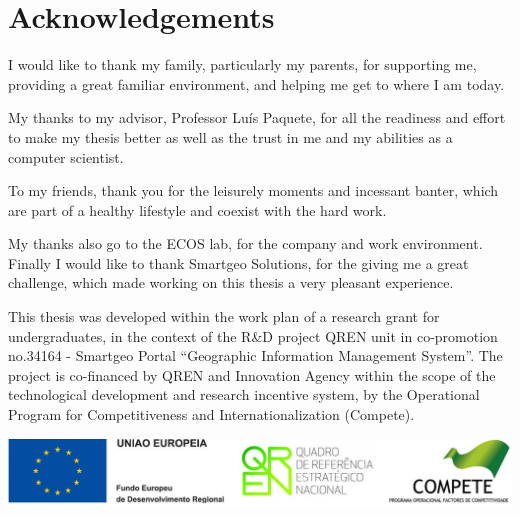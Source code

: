 

\cleardoublepage
\pagestyle{plain}

\cleardoublepage
\chapter*{Acknowledgements}
\large I would like to thank my family, particularly my parents, for supporting me, providing a great familiar environment, and helping me get to where I am today.

My thanks to my advisor, Professor Luís Paquete, for all the readiness and effort to make my thesis better as well as the trust in me and my abilities as a computer scientist. 

To my friends, thank you for the leisurely moments and incessant banter, which are part of a healthy lifestyle and coexist with the hard work. 

My thanks also go to the ECOS lab, for the company and work environment. Finally I would like to thank Smartgeo Solutions, for the giving me a great challenge, which made working on this thesis a very pleasant experience.

\vfill
\small This thesis was developed within the work plan of a research grant for undergraduates, in the context of the R\&D project QREN unit in co-promotion no.34164 - Smartgeo Portal ``Geographic Information Management System''. The project is co-financed by QREN and Innovation Agency within the scope of the technological development and research incentive system, by the Operational Program for Competitiveness and Internationalization (Compete).
\vspace{0.3cm}
\normalsize
\begin{center}
\includegraphics[width=0.7\linewidth]{Pictures/acks}
\end{center}
\cleardoublepage 
\tableofcontents
\cleardoublepage
\listoffigures
\listoftables

